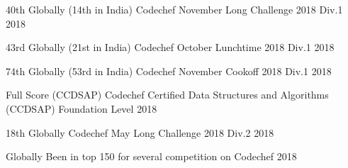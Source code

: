 




\begin{cvhonors}


\cvhonor
{40th Globally (14th in India)} %
{Codechef November Long Challenge 2018 Div.1} %
{} %
{2018} %


\cvhonor
{43rd Globally (21st in India)} %
{Codechef October Lunchtime 2018 Div.1} %
{} %
{2018} %


\cvhonor
{74th Globally (53rd in India)} %
{Codechef November Cookoff 2018 Div.1} %
{} %
{2018} %


\cvhonor
{Full Score (CCDSAP)} %
{Codechef Certified Data Structures and Algorithms (CCDSAP) Foundation Level} %
{} %
{2018} %


\cvhonor
{18th Globally} %
{Codechef May Long Challenge 2018 Div.2} %
{} %
{2018} %


\cvhonor
{Globally} %
{Been in top 150 for several competition on Codechef} %
{} %
{2018} %










\end{cvhonors}